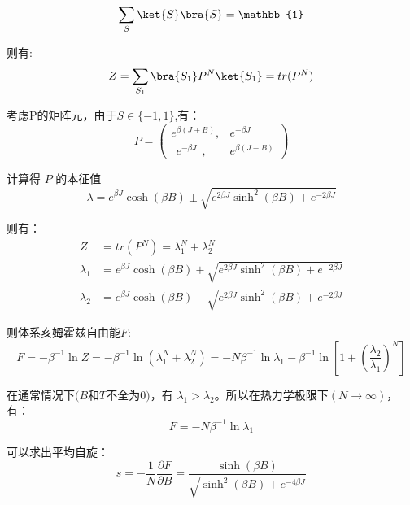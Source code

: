 \begin{equation}
\sum_S\ket{S}\bra{S}=\mathbb{1}
\end{equation}

则有:
\begin{equation}
Z=\sum\limits_{S_1}\bra{S_1}P^N\ket{S_1}=tr(P^N)
\end{equation}

考虑P的矩阵元，由于$S\in\{-1,1\}$,有：
$$P=\begin{pmatrix}
e^{\beta(J+B)},&e^{-\beta J} \\
~~e^{-\beta J}~~, & e^{\beta(J-B)}
\end{pmatrix}$$

计算得 $P$ 的本征值
$$\lambda=e^{\beta J}\cosh{(\beta B)}\pm \sqrt{e^{2\beta J }\sinh^2{(\beta B)}+e^{-2\beta J }}$$

则有：
\begin{align}
Z&=tr(P^N)=\lambda_1^N+\lambda_2^N \\
\lambda_1&=e^{\beta J}\cosh{(\beta B)}+ \sqrt{e^{2\beta J }\sinh^2{(\beta B)}+e^{-2\beta J }} \\
\lambda_2&=e^{\beta J}\cosh{(\beta B)}- \sqrt{e^{2\beta J }\sinh^2{(\beta B)}+e^{-2\beta J }}
\end{align}

则体系亥姆霍兹自由能$F$:
$$F=-\beta^{-1}\ln{Z}=-\beta^{-1}\ln{(\lambda_1^N+\lambda_2^N)}=-N\beta^{-1}\ln{\lambda_1}-\beta^{-1}\ln[1+(\frac{\lambda_2}{\lambda_1})^N]$$

在通常情况下$(B$和$T$不全为$0)$，有 $\lambda_1>\lambda_2$。所以在热力学极限下$(N\rightarrow\infty)$，有：
$$F=-N\beta^{-1}\ln{\lambda_1}$$

可以求出平均自旋：
$$s=-\frac{1}{N}\frac{\partial F}{\partial B}=\frac{\sinh(\beta B)}{\sqrt{\sinh^2(\beta B)+e^{-4\beta J}}}$$










